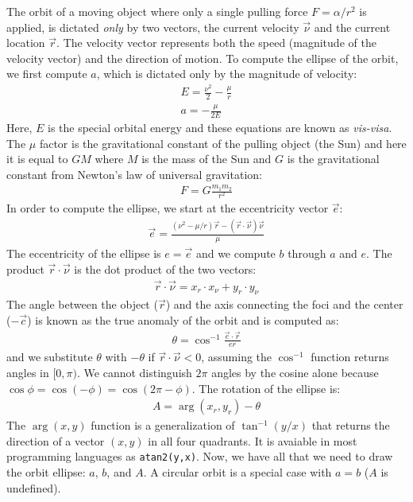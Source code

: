 \begin{appendices}
The orbit of a moving object where only a single pulling force $F = \alpha/r^2$ is applied, is dictated \emph{only} by two vectors, the current velocity $\vec{\nu}$ and the current location $\vec{r}$. The velocity vector represents both the speed (magnitude of the velocity vector) and the direction of motion. To compute the ellipse of the orbit, we first compute $a$, which is dictated only by the magnitude of velocity:
\begin{eqnarray*}
E = \frac{\nu^2}{2}-\frac{\mu}{r}\\
a = -\frac{\mu}{2E}
\end{eqnarray*}
Here, $E$ is the special orbital energy and these equations are known as \emph{vis-visa}. The $\mu$ factor is the gravitational constant of the pulling object (the Sun) and here it is equal to $GM$ where $M$ is the mass of the Sun and $G$ is the gravitational constant from Newton's law of universal gravitation:
\begin{eqnarray*}
F = G\frac{m_1 m_2}{r^2}
\end{eqnarray*}
In order to compute the ellipse, we start at the eccentricity vector $\vec{e}$:
\begin{eqnarray*}
\vec{e} = \frac{(\nu^2 - \mu/r)\vec{r} - (\vec{r} \cdot \vec{\nu})\vec{\nu}}{\mu}
\end{eqnarray*}
The eccentricity of the ellipse is $e = \vec{e}$ and we compute $b$ through $a$ and $e$. The product $\vec{r} \cdot \vec{\nu}$ is the dot product of the two vectors:
\begin{eqnarray*}
\vec{r} \cdot \vec{\nu} = x_r \cdot x_{\nu} + y_r \cdot y_{\nu}
\end{eqnarray*}
The angle between the object ($\vec{r}$) and the axis connecting the foci and the center ($-\vec{c}$) is known as the true anomaly of the orbit and is computed as:
\begin{eqnarray*}
\theta = \cos^{-1}\frac{\vec{e} \cdot \vec{r}}{er}
\end{eqnarray*}
and we substitute $\theta$ with $-\theta$ if $\vec{r} \cdot \vec{\nu} < 0$, assuming the $\cos^{-1}$ function returns angles in $[0,\pi)$. We cannot distinguish $2\pi$ angles by the cosine alone because $\cos{\phi} = \cos{(-\phi)}
= \cos{(2\pi-\phi)}$. The rotation of the ellipse is:
\begin{eqnarray*}
A = \arg(x_r,y_r) - \theta
\end{eqnarray*}
The $\arg(x,y)$ function is a generalization of $\tan^{-1}(y/x)$ that returns the direction of a vector $(x,y)$ in all four quadrants. It is avaiable in most programming languages as \verb#atan2(y,x)#. Now, we have all that we need to draw the orbit ellipse: $a$, $b$, and $A$. A circular orbit is a special case with $a = b$ ($A$ is undefined).


\end{appendices}

